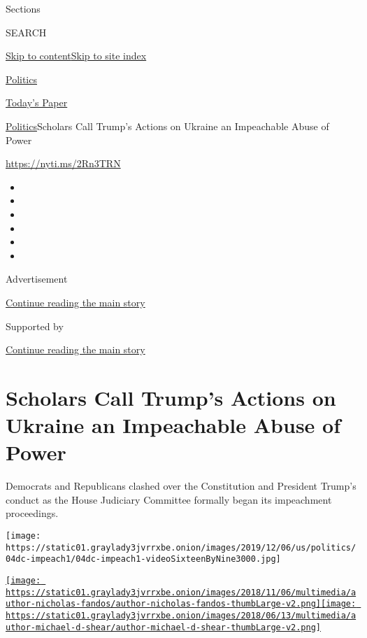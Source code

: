 Sections

SEARCH

\protect\hyperlink{site-content}{Skip to
content}\protect\hyperlink{site-index}{Skip to site index}

\href{https://www.nytimes3xbfgragh.onion/section/politics}{Politics}

\href{https://myaccount.nytimes3xbfgragh.onion/auth/login?response_type=cookie\&client_id=vi}{}

\href{https://www.nytimes3xbfgragh.onion/section/todayspaper}{Today's
Paper}

\href{/section/politics}{Politics}\textbar{}Scholars Call Trump's
Actions on Ukraine an Impeachable Abuse of Power

\url{https://nyti.ms/2Rn3TRN}

\begin{itemize}
\item
\item
\item
\item
\item
\item
\end{itemize}

Advertisement

\protect\hyperlink{after-top}{Continue reading the main story}

Supported by

\protect\hyperlink{after-sponsor}{Continue reading the main story}

\hypertarget{scholars-call-trumps-actions-on-ukraine-an-impeachable-abuse-of-power}{%
\section{Scholars Call Trump's Actions on Ukraine an Impeachable Abuse
of
Power}\label{scholars-call-trumps-actions-on-ukraine-an-impeachable-abuse-of-power}}

Democrats and Republicans clashed over the Constitution and President
Trump's conduct as the House Judiciary Committee formally began its
impeachment proceedings.

\texttt{[image: https://static01.graylady3jvrrxbe.onion/images/2019/12/06/us/politics/04dc-impeach1/04dc-impeach1-videoSixteenByNine3000.jpg]}

\href{https://www.nytimes3xbfgragh.onion/by/nicholas-fandos}{\texttt{[image: https://static01.graylady3jvrrxbe.onion/images/2018/11/06/multimedia/author-nicholas-fandos/author-nicholas-fandos-thumbLarge-v2.png]}}\href{https://www.nytimes3xbfgragh.onion/by/michael-d-shear}{\texttt{[image: https://static01.graylady3jvrrxbe.onion/images/2018/06/13/multimedia/author-michael-d-shear/author-michael-d-shear-thumbLarge-v2.png]}}

